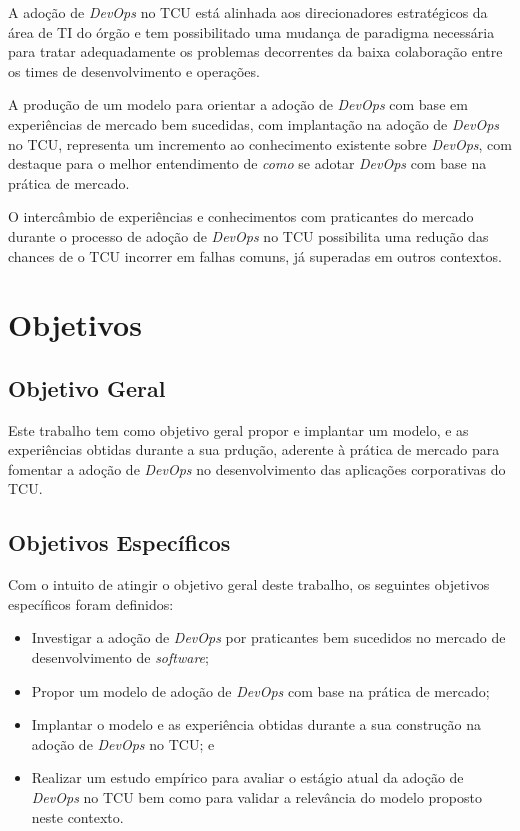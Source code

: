 A adoção de \textit{DevOps} no \acrshort{TCU} está alinhada aos direcionadores
estratégicos da área de \acrshort{TI} do órgão e tem possibilitado uma
mudança de paradigma necessária para tratar adequadamente os problemas
decorrentes da baixa colaboração entre os times de desenvolvimento e operações.

A produção de um modelo para orientar a adoção de \textit{DevOps} com base em
experiências de mercado bem sucedidas, com implantação na adoção de
\textit{DevOps} no \acrshort{TCU}, representa um
incremento ao conhecimento existente sobre \textit{DevOps}, com destaque
para o melhor entendimento de \emph{como} se adotar \textit{DevOps} com base na
prática de mercado.

O intercâmbio de experiências e conhecimentos com praticantes do mercado
durante o processo de adoção de \textit{DevOps} no TCU possibilita uma redução
das chances de o \acrshort{TCU} incorrer em falhas comuns, já superadas em
outros contextos.

\section{Objetivos}

\subsection{Objetivo Geral}

Este trabalho tem como objetivo geral propor e implantar um modelo, e as
experiências obtidas durante a sua prdução, aderente à prática
de mercado para fomentar a adoção de \textit{DevOps} no desenvolvimento das
aplicações corporativas do \acrshort{TCU}.

\subsection{Objetivos Específicos}
Com o intuito de atingir o objetivo geral deste trabalho, os seguintes objetivos
específicos foram definidos:

\begin{itemize}
\item Investigar a adoção de \textit{DevOps} por praticantes bem sucedidos no
mercado de desenvolvimento de \textit{software};
\item Propor um modelo de adoção de \textit{DevOps} com base na prática de mercado;
\item Implantar o modelo e as experiência obtidas durante a sua construção na
adoção de \textit{DevOps} no \acrshort{TCU}; e
\item Realizar um estudo empírico para avaliar o estágio atual da adoção de
\textit{DevOps} no \acrshort{TCU} bem como para validar a relevância do modelo
proposto neste contexto.
\end{itemize}

